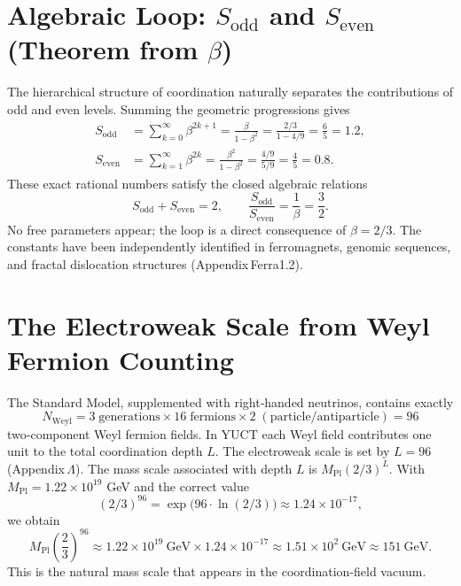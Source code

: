 \documentclass[12pt,a4paper]{article}
\begin{document}
	\section{Algebraic Loop: \(S_{\mathrm{odd}}\) and \(S_{\mathrm{even}}\) (Theorem from \(\beta\))}
	
	The hierarchical structure of coordination naturally separates the contributions of odd and even levels.  Summing the geometric progressions gives
	\begin{align}
		S_{\mathrm{odd}} &= \sum_{k=0}^{\infty} \beta^{2k+1} = \frac{\beta}{1-\beta^{2}} = \frac{2/3}{1 - 4/9} = \frac{6}{5} = 1.2, \label{eq:sodd}\\
		S_{\mathrm{even}} &= \sum_{k=1}^{\infty} \beta^{2k} = \frac{\beta^{2}}{1-\beta^{2}} = \frac{4/9}{5/9} = \frac{4}{5} = 0.8. \label{eq:seven}
	\end{align}
	These exact rational numbers satisfy the closed algebraic relations
	\begin{equation}
		\boxed{S_{\mathrm{odd}} + S_{\mathrm{even}} = 2, \qquad \frac{S_{\mathrm{odd}}}{S_{\mathrm{even}}} = \frac{1}{\beta} = \frac{3}{2}}.
		\label{eq:algebraic-loop}
	\end{equation}
	No free parameters appear; the loop is a direct consequence of \(\beta = 2/3\).  The constants have been independently identified in ferromagnets, genomic sequences, and fractal dislocation structures (Appendix Ferra1.2).
	
	\section{The Electroweak Scale from Weyl Fermion Counting}
	
	The Standard Model, supplemented with right‑handed neutrinos, contains exactly
	\begin{equation}
		N_{\mathrm{Weyl}} = 3\;\text{generations} \times 16\;\text{fermions} \times 2\;(\text{particle/antiparticle}) = 96
	\end{equation}
	two‑component Weyl fermion fields.  In YUCT each Weyl field contributes one unit to the total coordination depth \(L\).  The electroweak scale is set by \(L = 96\) (Appendix \(\Lambda\)).  The mass scale associated with depth \(L\) is \(M_{\mathrm{Pl}} (2/3)^{L}\).  With \(M_{\mathrm{Pl}} = 1.22 \times 10^{19}\) GeV and the correct value
	\begin{equation}
		(2/3)^{96} = \exp\bigl(96 \cdot \ln(2/3)\bigr) \approx 1.24 \times 10^{-17},
	\end{equation}
	we obtain
	\begin{equation}
		M_{\mathrm{Pl}} \left(\frac{2}{3}\right)^{96} \approx 1.22 \times 10^{19}\ \mathrm{GeV} \times 1.24 \times 10^{-17} \approx 1.51 \times 10^{2}\ \mathrm{GeV} \approx 151\ \mathrm{GeV}.
	\end{equation}
	This is the natural mass scale that appears in the coordination‑field vacuum.
	
\end{document}
